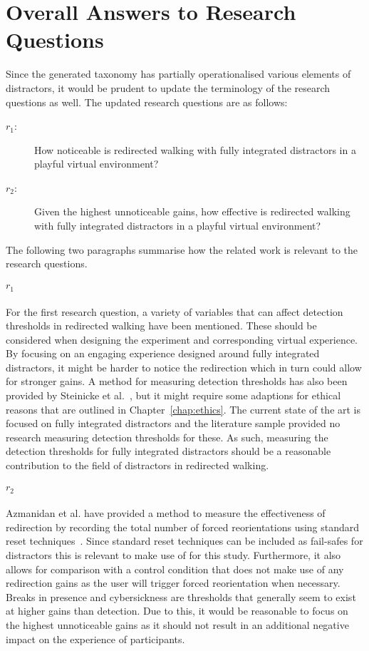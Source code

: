 \section{Overall Answers to Research Questions}
Since the generated taxonomy has partially operationalised various elements of distractors, it would be prudent to update the terminology of the research questions as well. 
The updated research questions are as follows: 
\begin{description}
   \item[$r_1$: ] How noticeable is redirected walking with fully integrated distractors in a playful virtual environment?
   \item[$r_2$: ] Given the highest unnoticeable gains, how effective is redirected walking with fully integrated distractors in a playful virtual environment?
\end{description}

The following two paragraphs summarise how the related work is relevant to the research questions.

\paragraph{$r_1$}
For the first research question, a variety of variables that can affect detection thresholds in redirected walking have been mentioned. These should be considered when designing the experiment and corresponding virtual experience. By focusing on an engaging experience designed around fully integrated distractors, it might be harder to notice the redirection which in turn could allow for stronger gains. A method for measuring detection thresholds has also been provided by Steinicke et al.~\cite{5072212}, but it might require some adaptions for ethical reasons that are outlined in Chapter~\ref{chap:ethics}. The current state of the art is focused on fully integrated distractors and the literature sample provided no research measuring detection thresholds for these. As such, measuring the detection thresholds for fully integrated distractors should be a reasonable contribution to the field of distractors in redirected walking.

\paragraph{$r_2$}
Azmanidan et al. have provided a method to measure the effectiveness of redirection by recording the total number of forced reorientations using standard reset techniques~\cite{azmandian2015physical}. Since standard reset techniques can be included as fail-safes for distractors this is relevant to make use of for this study. Furthermore, it also allows for comparison with a control condition that does not make use of any redirection gains as the user will trigger forced reorientation when necessary. 
Breaks in presence and cybersickness are thresholds that generally seem to exist at higher gains than detection. Due to this, it would be reasonable to focus on the highest unnoticeable gains as it should not result in an additional negative impact on the experience of participants. 

